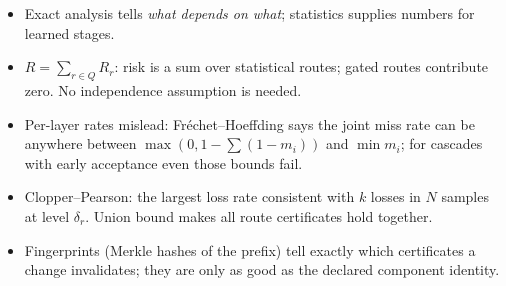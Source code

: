 \begin{recap}
\begin{itemize}
\item Exact analysis tells \emph{what depends on what}; statistics supplies numbers for learned stages.
\item $R=\sum_{r\in Q}R_r$: risk is a sum over statistical routes; gated routes contribute zero. No independence assumption is needed.
\item Per-layer rates mislead: Fr\'echet--Hoeffding says the joint miss rate can be anywhere between $\max(0,1-\sum(1-m_i))$ and $\min m_i$; for cascades with early acceptance even those bounds fail.
\item Clopper--Pearson: the largest loss rate consistent with $k$ losses in $N$ samples at level $\delta_r$. Union bound makes all route certificates hold together.
\item Fingerprints (Merkle hashes of the prefix) tell exactly which certificates a change invalidates; they are only as good as the declared component identity.
\end{itemize}
\end{recap}
